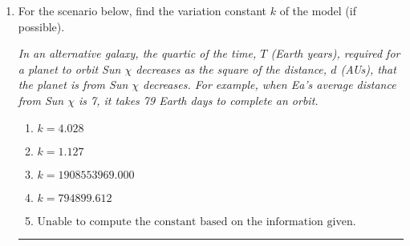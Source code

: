 \documentclass[14pt]{extbook}
\newcommand{\litem}[1]{\item#1\hspace*{-1cm}\rule{\textwidth}{0.4pt}}
\begin{document}
\begin{enumerate}
{\begin{enumerate}[label=\Alph*.]
\end{enumerate} }
\litem{
For the scenario below, find the variation constant $k$ of the model (if possible).
\begin{center}
    \textit{ In an alternative galaxy, the quartic of the time, $T$ (Earth years), required for a planet to orbit Sun $\chi$ decreases as the square of the distance, $d$ (AUs), that the planet is from Sun $\chi$ decreases. For example, when Ea's average distance from Sun $\chi$ is 7, it takes 79 Earth days to complete an orbit. }
\end{center}
\begin{enumerate}[label=\Alph*.]
\item \( k = 4.028 \)
\item \( k = 1.127 \)
\item \( k = 1908553969.000 \)
\item \( k = 794899.612 \)
\item \( \text{Unable to compute the constant based on the information given.} \)

\end{enumerate} }
\end{enumerate}
\end{document}
